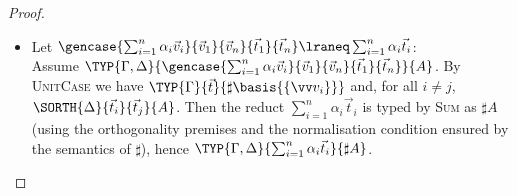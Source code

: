 \begin{proof}
\begin{itemize}
    \item Let
      $\gencase{\sum_{i=1}^n\alpha_i\vec{v}_{i}}{\vec{v}_{1}}{\vec{v}_{n}}{\vec{t}_{1}}{\vec{t}_{n}}
      \lraneq \sum_{i=1}^n\alpha_i\vec{t}_{i}$: \\ Assume 
      $\TYP{\Gamma,\Delta}{\gencase{\sum_{i=1}^n\alpha_i\vec{v}_{i}}{\vec{v}_{1}}{\vec{v}_{n}}{\vec{t}_{1}}{\vec{t}_{n}}}{A}$.
      By \textsc{UnitCase} we have $\TYP{\Gamma}{\vec t}{\sharp\basis{\{\vv
      v_i\}}}$ and, for all $i\neq j$, $\SORTH{\Delta}{\vec t_i}{\vec t_j}{A}$.
      Then the reduct $\sum_{i=1}^{n}\alpha_i \vec{t}_{i}$ is typed by \textsc{Sum}
      as $\sharp A$ (using the orthogonality premises and the normalisation
      condition ensured by the semantics of $\sharp$), hence
      $\TYP{\Gamma,\Delta}{\sum_{i=1}^{n}\alpha_i \vec{t}_{i}}{\sharp A}$.
      \qedhere
  \end{itemize}
\end{proof}
